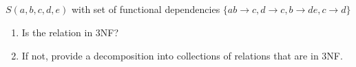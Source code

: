 \documentclass{article}
\begin{document}
\subsection*{} $S(a, b, c, d, e)$ with set of functional dependencies $\{ab \rightarrow c, d \rightarrow c, b \rightarrow de, c \rightarrow d\}$
\begin{enumerate}
    \item Is the relation in 3NF?
    \item If not, provide a decomposition into collections of relations that are in 3NF.
\end{enumerate}
\end{document}
